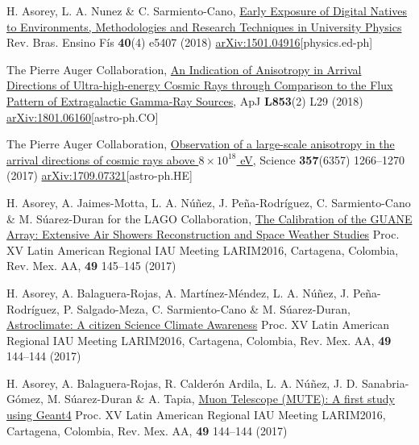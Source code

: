 \begin{etaremune}
\item {} H. Asorey, L. A. Nunez \& C. Sarmiento-Cano, \href{http://dx.doi.org/10.1590/1806-9126-rbef-2018-0092}{{Early Exposure of Digital Natives to Environments, Methodologies and Research Techniques in University Physics}} Rev. Bras. Ensino Fís {\bf{40}}(4) e5407 (2018) \href{http://arxiv.org/abs/1501.04916}{arXiv:1501.04916}[physics.ed-ph]

\item {}The Pierre Auger Collaboration, \href{https://doi.org/10.3847/2041-8213/aaa66d}{{An Indication of Anisotropy in Arrival Directions of Ultra-high-energy Cosmic Rays through Comparison to the Flux Pattern of Extragalactic Gamma-Ray Sources}}, ApJ {\bf{L853}}(2) L29 (2018) \href{https://arxiv.org/abs/1801.06160}{arXiv:1801.06160}[astro-ph.CO]

\item {}The Pierre Auger Collaboration, \href{https://doi.org/10.1126/science.aan4338}{{Observation of a large-scale anisotropy in the arrival directions of cosmic rays above $8\times 10^{18}$ eV}}, Science {\bf{357}}(6357) 1266--1270 (2017) \href{https://arxiv.org/abs/1709.07321}{arXiv:1709.07321}[astro-ph.HE]

\item {} H. Asorey, A. Jaimes-Motta, L. A. Núñez, J. Peña-Rodríguez, C. Sarmiento-Cano \& M. Súarez-Duran for the LAGO Collaboration, \href{http://www.astroscu.unam.mx/rmaa/RMxAC..49/PDF/RMxAC..49\_poster3.pdf}{{The Calibration of the GUANE Array: Extensive Air Showers Reconstruction and Space Weather Studies}} \en Proc. XV Latin American Regional IAU Meeting LARIM2016, Cartagena, Colombia, Rev. Mex. AA, {\bf{49}} 145--145 (2017)

\item {} H. Asorey, A. Balaguera-Rojas, A. Martínez-Méndez, L. A. Núñez, J. Peña-Rodríguez, P. Salgado-Meza, C. Sarmiento-Cano \& M. Súarez-Duran, \href{http://www.astroscu.unam.mx/rmaa/RMxAC..49/PDF/RMxAC..49\_poster2.pdf}{{Astroclimate: A citizen Science Climate Awareness}} \en Proc. XV Latin American Regional IAU Meeting LARIM2016, Cartagena, Colombia, Rev. Mex. AA, {\bf{49}} 144--144 (2017)

\item {} H. Asorey, A. Balaguera-Rojas, R. Calderón Ardila, L. A. Núñez, J. D. Sanabria-Gómez, M. Súarez-Duran \& A. Tapia, \href{http://www.astroscu.unam.mx/rmaa/RMxAC..49/PDF/RMxAC..49\_poster2.pdf}{{Muon Telescope (MUTE): A first study using Geant4}} \en Proc. XV Latin American Regional IAU Meeting LARIM2016, Cartagena, Colombia, Rev. Mex. AA, {\bf{49}} 144--144 (2017)


\end{etaremune}
